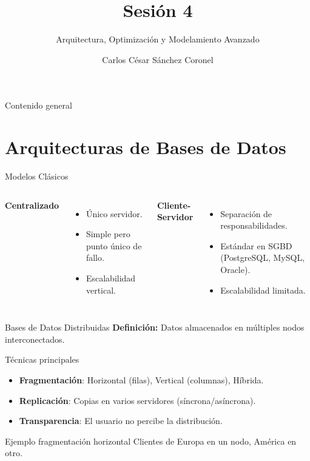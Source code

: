 \documentclass[aspectratio=169, 10pt, xcolor=table]{beamer}
\title[SESIÓN 4 BBDD]{\textbf{Sesión 4}}
\subtitle{Arquitectura, Optimización y Modelamiento Avanzado}
\author[Prof. C. Sánchez]{Carlos César Sánchez Coronel}
\institute{\textbf{BASES DE DATOS}}
\date{}
\begin{document}
\begin{frame}
    \titlepage
\end{frame}

\begin{frame}{Contenido general}
    \tableofcontents
\end{frame}

\section{Arquitecturas de Bases de Datos}

\begin{frame}{Modelos Clásicos}
    \begin{columns}[t]
        \textbf{Centralizado}
        \begin{itemize}
            \item Único servidor.
            \item Simple pero punto único de fallo.
            \item Escalabilidad vertical.
        \end{itemize}
        \textbf{Cliente-Servidor}
        \begin{itemize}
            \item Separación de responsabilidades.
            \item Estándar en SGBD (PostgreSQL, MySQL, Oracle).
            \item Escalabilidad limitada.
        \end{itemize}
    \end{columns}
\end{frame}

\begin{frame}{Bases de Datos Distribuidas}
    \textbf{Definición:} Datos almacenados en múltiples nodos interconectados.
    \begin{block}{Técnicas principales}
        \begin{itemize}
            \item \textbf{Fragmentación}: Horizontal (filas), Vertical (columnas), Híbrida.
            \item \textbf{Replicación}: Copias en varios servidores (síncrona/asíncrona).
            \item \textbf{Transparencia}: El usuario no percibe la distribución.
        \end{itemize}
    \end{block}
    \begin{exampleblock}{Ejemplo fragmentación horizontal}
        Clientes de Europa en un nodo, América en otro.
    \end{exampleblock}
\end{frame}
\end{document}
